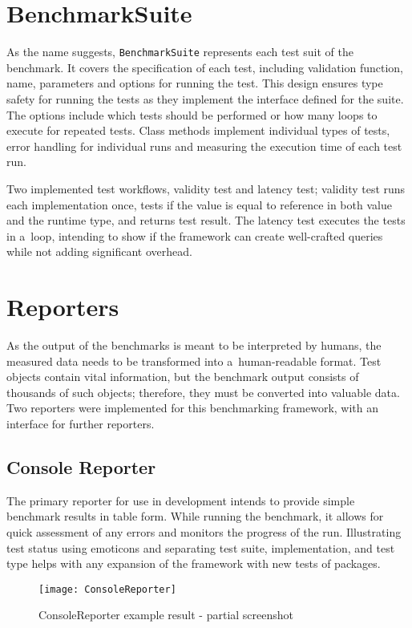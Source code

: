 \section{BenchmarkSuite}

As the name suggests, \texttt{BenchmarkSuite} represents each test suit of the
benchmark. It covers the specification of each test, including validation
function, name, parameters and options for running the test. This design ensures
type safety for running the tests as they implement the interface defined for
the suite. The options include which tests should be performed or how many loops
to execute for repeated tests. Class methods implement individual types of
tests, error handling for individual runs and measuring the execution time of
each test run.

Two implemented test workflows, validity test and latency test; validity test
runs each implementation once, tests if the value is equal to reference in both
value and the runtime type, and returns test result. The latency test executes
the tests in a~loop, intending to show if the framework can create well-crafted
queries while not adding significant overhead.

\section{Reporters}
As the output of the benchmarks is meant to be interpreted by humans, the
measured data needs to be transformed into a~human-readable format. Test objects
contain vital information, but the benchmark output consists of thousands of
such objects; therefore, they must be converted into valuable data. Two
reporters were implemented for this benchmarking framework, with an interface
for further reporters.

\subsection*{Console Reporter}
The primary reporter for use in development intends to provide simple benchmark
results in table form. While running the benchmark, it allows for quick
assessment of any errors and monitors the progress of the run. Illustrating test
status using emoticons and separating test suite, implementation, and test type
helps with any expansion of the framework with new tests of packages.

\begin{figure}[H]
    \caption{ConsoleReporter example result - partial screenshot}
    \label{fig:ConsoleReporter}
    \centering
    \texttt{[image: ConsoleReporter]}
\end{figure}

